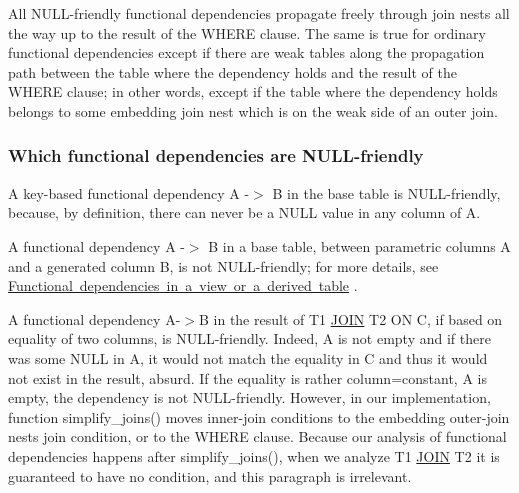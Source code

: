 All N\+U\+LL-\/friendly functional dependencies propagate freely through join nests all the way up to the result of the W\+H\+E\+RE clause. The same is true for ordinary functional dependencies except if there are weak tables along the propagation path between the table where the dependency holds and the result of the W\+H\+E\+RE clause; in other words, except if the table where the dependency holds belongs to some embedding join nest which is on the weak side of an outer join.\hypertarget{group__AGGREGATE__CHECKS_NFFDS}{}\subsubsection{Which functional dependencies are N\+U\+L\+L-\/friendly}\label{group__AGGREGATE__CHECKS_NFFDS}
A key-\/based functional dependency A -\/$>$ B in the base table is N\+U\+LL-\/friendly, because, by definition, there can never be a N\+U\+LL value in any column of A.

A functional dependency A -\/$>$ B in a base table, between parametric columns A and a generated column B, is not N\+U\+LL-\/friendly; for more details, see \mbox{\hyperlink{group__AGGREGATE__CHECKS_FDVIEW}{Functional dependencies in a view or a derived table}} .

A functional dependency A-\/$>$B in the result of T1 \mbox{\hyperlink{classJOIN}{J\+O\+IN}} T2 ON C, if based on equality of two columns, is N\+U\+LL-\/friendly. Indeed, A is not empty and if there was some N\+U\+LL in A, it would not match the equality in C and thus it would not exist in the result, absurd. If the equality is rather column=constant, A is empty, the dependency is not N\+U\+LL-\/friendly. However, in our implementation, function {\ttfamily simplify\+\_\+joins()} moves inner-\/join conditions to the embedding outer-\/join nest\textquotesingle{}s join condition, or to the W\+H\+E\+RE clause. Because our analysis of functional dependencies happens after simplify\+\_\+joins(), when we analyze T1 \mbox{\hyperlink{classJOIN}{J\+O\+IN}} T2 it is guaranteed to have no condition, and this paragraph is irrelevant.

